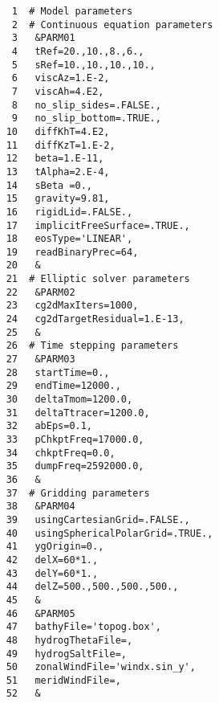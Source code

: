 
\begin{verbatim}
     1	# Model parameters
     2	# Continuous equation parameters
     3	 &PARM01
     4	 tRef=20.,10.,8.,6.,
     5	 sRef=10.,10.,10.,10.,
     6	 viscAz=1.E-2,
     7	 viscAh=4.E2,
     8	 no_slip_sides=.FALSE.,
     9	 no_slip_bottom=.TRUE.,
    10	 diffKhT=4.E2,
    11	 diffKzT=1.E-2,
    12	 beta=1.E-11,
    13	 tAlpha=2.E-4,
    14	 sBeta =0.,
    15	 gravity=9.81,
    16	 rigidLid=.FALSE.,
    17	 implicitFreeSurface=.TRUE.,
    18	 eosType='LINEAR',
    19	 readBinaryPrec=64,
    20	 &
    21	# Elliptic solver parameters
    22	 &PARM02
    23	 cg2dMaxIters=1000,
    24	 cg2dTargetResidual=1.E-13,
    25	 &
    26	# Time stepping parameters
    27	 &PARM03
    28	 startTime=0.,
    29	 endTime=12000., 
    30	 deltaTmom=1200.0,
    31	 deltaTtracer=1200.0,
    32	 abEps=0.1,
    33	 pChkptFreq=17000.0,
    34	 chkptFreq=0.0,
    35	 dumpFreq=2592000.0,
    36	 &
    37	# Gridding parameters
    38	 &PARM04
    39	 usingCartesianGrid=.FALSE.,
    40	 usingSphericalPolarGrid=.TRUE.,
    41	 ygOrigin=0.,
    42	 delX=60*1.,
    43	 delY=60*1.,
    44	 delZ=500.,500.,500.,500.,
    45	 &
    46	 &PARM05
    47	 bathyFile='topog.box',
    48	 hydrogThetaFile=,
    49	 hydrogSaltFile=,
    50	 zonalWindFile='windx.sin_y',
    51	 meridWindFile=,
    52	 &
\end{verbatim}
